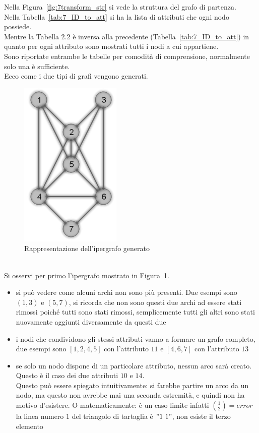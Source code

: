 %
%
\noindent Nella Figura~\ref{fig:7transform_str} si vede la struttura del grafo di partenza.\\
Nella Tabella~\ref{tab:7_ID_to_att} si ha la lista di attributi che ogni nodo possiede.\\
Mentre la Tabella 2.2 %
è inversa alla precedente (Tabella~\ref{tab:7_ID_to_att}) in quanto per ogni attributo sono mostrati tutti i nodi a cui appartiene.\\
Sono riportate entrambe le tabelle per comodità di comprensione, normalmente solo una è sufficiente.\\
Ecco come i due tipi di grafi vengono generati.
%
\begin{figure}[htp]
	\centering
	\includegraphics{immagini/7transform_hyper}
	\caption{Rappresentazione dell'ipergrafo generato}
	\label{fig:7transform_hyper}
\end{figure}
\\
Si osservi per primo l'ipergrafo mostrato in Figura~\ref{fig:7transform_hyper}.
\begin{itemize}
	\item  si può vedere come alcuni archi non sono più presenti. Due esempi sono $(1,3)$ e $(5,7)$, si ricorda che non sono questi due archi ad essere stati rimossi poiché tutti sono stati rimossi, semplicemente tutti gli altri sono stati nuovamente aggiunti diversamente da questi due
	\item  i nodi che condividono gli stessi attributi vanno a formare un grafo completo, due esempi sono $[1,2,4,5]$ con l'attributo $11$ e $[4,6,7]$ con l'attributo $13$
	\item  se solo un nodo dispone di un particolare attributo, nessun arco sarà creato. Questo è il caso dei due attributi $10$ e $14$.\\
	Questo può essere spiegato intuitivamente: si farebbe partire un arco da un nodo, ma questo non avrebbe mai una seconda estremità, e quindi non ha motivo d'esistere. O matematicamente: è un caso limite infatti $ \binom{1}{2} = error$ la linea numero $1$ del triangolo di tartaglia è $"1\ 1"$, non esiste il terzo elemento
\end{itemize}
